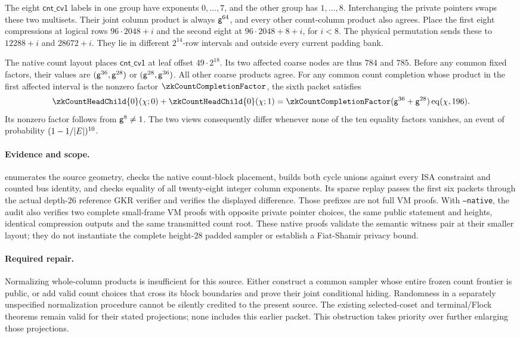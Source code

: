 The eight $\mathsf{cnt\_cv1}$ labels in one group have exponents $0,\ldots,7$, and the other group has $1,\ldots,8$. Interchanging the private pointers swaps these two multisets. Their joint column product is always $\mathsf{g}^{64}$, and every other count-column product also agrees. Place the first eight compressions at logical rows $96\cdot2048+i$ and the second eight at $96\cdot2048+8+i$, for $i<8$. The physical permutation sends these to $12288+i$ and $28672+i$. They lie in different $2^{14}$-row intervals and outside every current padding bank.

The native count layout places $\mathsf{cnt\_cv1}$ at leaf offset $49\cdot2^{18}$. Its two affected coarse nodes are thus $784$ and $785$. Before any common fixed factors, their values are $(\mathsf{g}^{36},\mathsf{g}^{28})$ or $(\mathsf{g}^{28},\mathsf{g}^{36})$. All other coarse products agree. For any common count completion whose product in the first affected interval is the nonzero factor $\zkCountCompletionFactor$, the sixth packet satisfies
\[
 \zkCountHeadChild{0}(\fc;0)+\zkCountHeadChild{0}(\fc;1)
 =\zkCountCompletionFactor(\gen^{36}+\gen^{28})\eq(\fc,196).
\]
Its nonzero factor follows from $\mathsf{g}^8\ne1$. The two views consequently differ whenever none of the ten equality factors vanishes, an event of probability $(1-1/|E|)^{10}$.

\paragraph{Evidence and scope.}  enumerates the source geometry, checks the native count-block placement, builds both cycle unions against every ISA constraint and counted bus identity, and checks equality of all twenty-eight integer column exponents. Its sparse replay passes the first six packets through the actual depth-$26$ reference GKR verifier and verifies the displayed difference. Those prefixes are not full VM proofs. With \texttt{--native}, the audit also verifies two complete small-frame VM proofs with opposite private pointer choices, the same public statement and heights, identical compression outputs and the same transmitted count root. These native proofs validate the semantic witness pair at their smaller layout; they do not instantiate the complete height-$28$ padded sampler or establish a Fiat-Shamir privacy bound.

\paragraph{Required repair.} Normalizing whole-column products is insufficient for this source. Either construct a common sampler whose entire frozen count frontier is public, or add valid count choices that cross its block boundaries and prove their joint conditional hiding. Randomness in a separately unspecified normalization procedure cannot be silently credited to the present source. The existing selected-coset and terminal/Flock theorems remain valid for their stated projections; none includes this earlier packet. This obstruction takes priority over further enlarging those projections.

